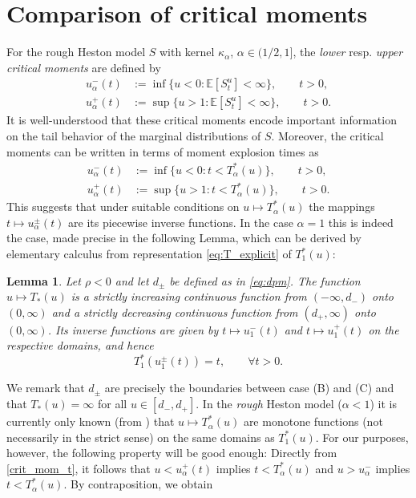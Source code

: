 \documentclass[12pt,a4paper]{amsart}
\numberwithin{equation}{section}
\numberwithin{equation}{section}
\newtheorem{lemma}[theorem]{Lemma}
\theoremstyle{nonumberplain}
\newcommand{\EE}{\mathbb{E}}
\begin{document}
\section{Comparison of critical moments}
For the rough Heston model $S$ with kernel $\kappa_\alpha$, $\alpha \in (1/2,1]$, the \textit{lower} resp.{} \textit{upper critical moments} are defined by 
\begin{subequations}\label{crit_mom_alpha}
\begin{align}
	  u_{\alpha}^-(t) &:= \inf\{u < 0: \EE[S_t^u] < \infty \}, \qquad t>0,\\
	  u_{\alpha}^+(t) &:= \sup\{u > 1: \EE[S_t^u] < \infty \}, \qquad t>0.
\end{align}
\end{subequations}
It is well-understood that these critical moments encode important information on the tail behavior of the marginal distributions of $S$. Moreover, the critical moments can be written in terms of moment explosion times as
\begin{subequations}\label{crit_mom_t}
\begin{align}
	  u_{\alpha}^-(t) &:= \inf\{u < 0: t < T_\alpha^*(u) \}, \qquad t>0,\\
	  u_{\alpha}^+(t) &:= \sup\{u > 1: t < T_\alpha^*(u) \}, \qquad t>0.
\end{align}
\end{subequations}
This suggests that under suitable conditions on $u \mapsto T_\alpha^*(u)$ the mappings $t \mapsto u_\alpha^\pm(t)$ are its piecewise inverse functions. In the case $\alpha = 1$ this is indeed the case, made precise in the following Lemma, which can be derived by elementary calculus from representation \eqref{eq:T_explicit} of $T_1^*(u)$:
\begin{lemma}\label{lem:T_inversion}
Let $\rho <0$ and let $d_\pm$ be defined as in \eqref{eq:dpm}. The function $u \mapsto T_*(u)$ is a strictly increasing continuous function from $(-\infty,d_-)$ onto $(0,\infty)$ and a strictly decreasing continuous function from $(d_+,\infty)$ onto $(0,\infty)$. Its inverse functions are given by $t \mapsto u_1^-(t)$ and $t \mapsto u_1^+(t)$ on the respective domains, and hence
\begin{equation}\label{eq: explosion_critmom_relation_1}
T_1^*(u_1^\pm(t)) = t, \qquad \forall t > 0.
\end{equation}
\end{lemma}
We remark that $d_\pm$ are precisely the boundaries between case (B) and (C) and that $T_*(u) = \infty$ for all $u \in [d_-,d_+]$. In the \textit{rough} Heston model ($\alpha < 1$) it is currently only known (from \cite{gerhold2018moment}) that $u \mapsto T_\alpha^*(u)$ are monotone functions (not necessarily in the strict sense) on the same domains as $T_1^*(u)$. For our purposes, however, the following property will be good enough: Directly from \eqref{crit_mom_t}, it follows that $u < u_\alpha^+(t)$ implies $t < T_\alpha^*(u)$ and $u > u_\alpha^-$ implies $t < T_\alpha^*(u)$. By contraposition, we obtain
\end{document}
